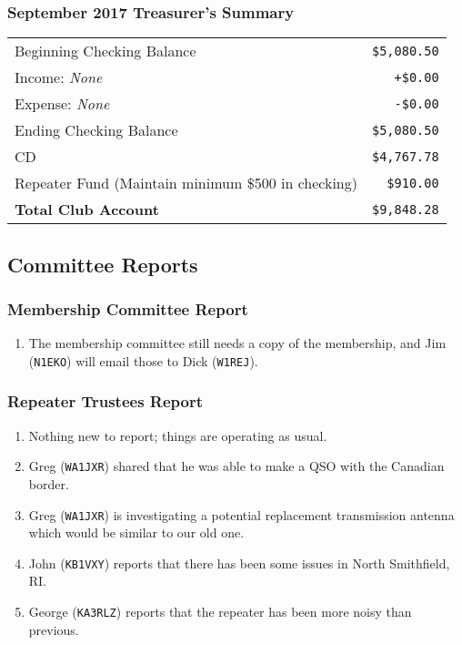 \documentclass[10pt,letterpaper]{article}
\begin{document}
\subsubsection{September 2017 Treasurer's Summary}
\noindent
\begin{tabular}{|l|r|}
  \hline
  Beginning Checking Balance & \texttt{\$5,080.50} \\
  Income: \emph{None} & \texttt{+\$0.00} \\
  Expense: \emph{None} & \texttt{-\$0.00} \\
  Ending Checking Balance & \texttt{\$5,080.50} \\
  \hline
  \hline
  CD & \texttt{\$4,767.78} \\
  \hline
  \hline
  Repeater Fund (Maintain minimum \$500 in checking) & \texttt{\$910.00} \\
  \hline
  \hline
  \textbf{Total Club Account} & \texttt{\$9,848.28} \\
  \hline
\end{tabular}


\subsection{Committee Reports}

\subsubsection{Membership Committee Report}
\begin{enumerate}
  \item The membership committee still needs a copy of the membership, and Jim (\texttt{N1EKO}) will email those to Dick (\texttt{W1REJ}).
\end{enumerate}

\subsubsection{Repeater Trustees Report}
\begin{enumerate}
  \item Nothing new to report; things are operating as usual.
  \item Greg (\texttt{WA1JXR}) shared that he was able to make a QSO with the Canadian border.
  \item Greg (\texttt{WA1JXR}) is investigating a potential replacement transmission antenna which would be similar to our old one.
  \item John (\texttt{KB1VXY}) reports that there has been some issues in North Smithfield, RI.
  \item George (\texttt{KA3RLZ}) reports that the repeater has been more noisy than previous.
\end{enumerate}
\end{document}
